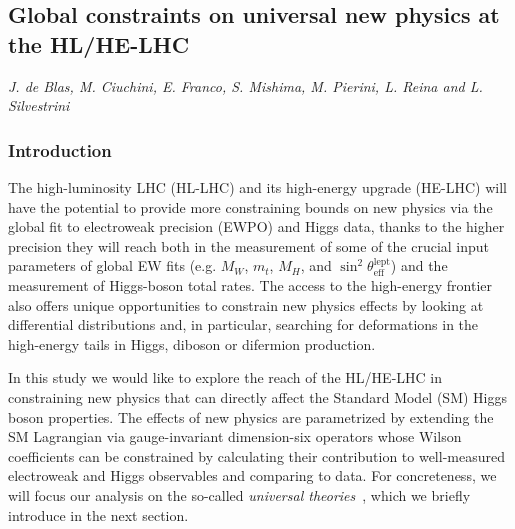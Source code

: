 

\newcommand{\HEPfit}{{\tt HEPfit}}


\subsection{Global constraints on universal new physics at the HL/HE-LHC}
\begin{center}
	\textit{J. de Blas, M. Ciuchini, E. Franco, S. Mishima, M. Pierini, L. Reina and L. Silvestrini}
\end{center}


\subsubsection{Introduction}

The high-luminosity LHC (HL-LHC) and its high-energy upgrade (HE-LHC)
will have the potential to provide more constraining bounds on new
physics via the global fit to electroweak precision (EWPO) and Higgs
data, thanks to the higher precision they will reach both in the
measurement of some of the crucial input parameters of global EW fits
(e.g. $M_W$, $m_t$, $M_H$, and
$\sin^2\theta_{\mathrm{eff}}^{\mathrm{lept}}$) and the measurement
of Higgs-boson total rates.
The access to the high-energy frontier also offers unique opportunities
to constrain new physics effects by looking at differential distributions and,
 in particular, searching for deformations in the 
high-energy tails in Higgs, diboson or difermion production.  

In this study we would
like to explore the reach of the HL/HE-LHC in constraining new physics
that can directly affect the Standard Model (SM) Higgs boson
properties. The effects of new physics are parametrized by extending
the SM Lagrangian via gauge-invariant dimension-six operators whose
Wilson coefficients can be constrained by calculating their
contribution to well-measured electroweak and Higgs observables and
comparing to data. For concreteness, we will focus our analysis on the 
so-called {\it universal theories}~\cite{Barbieri:2004qk,Wells:2015uba},
which we briefly introduce in the next section.



